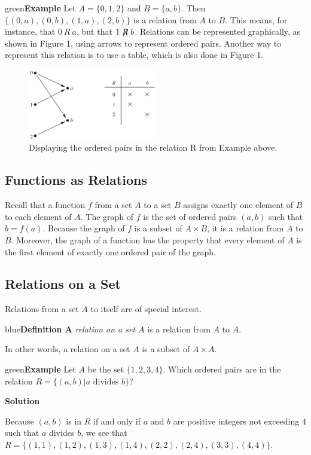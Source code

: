 \documentclass[11pt]{article}
\newenvironment{example}[1][\unskip]{\begin{mybox}{green}{\textbf{Example} {#1}}}{\end{mybox}}
\newenvironment{definition}[1]{\begin{mybox}{blue}{\textbf{Definition #1}}}{\end{mybox}}
\begin{document}
\begin{example}
Let $A = \{0, 1, 2\}$ and $B = \{a, b\}$. Then $\{(0, a), (0, b), (1, a), (2, b)\}$ is a relation from $A$ to $B$. This means, for instance, that $0\ R\ a$, but that $1 \centernot{R} b$. Relations can be represented graphically, as shown in Figure 1, using arrows to represent ordered pairs. Another way to represent this relation is to use a table, which is also done in Figure 1.
\end{example}

\begin{figure}[h!]
    \centering
    \includegraphics[width=0.5\textwidth]{./img/Displaying-ordered-pairs-Fig1.png}
    \caption{Displaying the ordered pairs in the relation R from Example above.}
    \label{fig:my_label}
\end{figure}

\subsection{Functions as Relations}
Recall that a function $f$ from a set $A$ to a set $B$ assigns exactly one element of $B$ to each element of $A$. The graph of $f$ is the set of ordered pairs $(a, b)$ such that $b = f(a)$. Because the graph of $f$ is a subset of $A \times B$, it is a relation from $A$ to $B$. Moreover, the graph of a function has the property that every element of $A$ is the first element of exactly one ordered pair of the graph.

\subsection{Relations on a Set}
Relations from a set $A$ to itself are of special interest.

\begin{definition}{2}
A \textit{relation on a set $A$} is a relation from $A$ to $A$.
\end{definition}

In other words, a relation on a set $A$ is a subset of $A \times A$.

\begin{example}
Let $A$ be the set $\{1, 2, 3, 4\}$. Which ordered pairs are in the relation $R = \{(a, b) | a \text{ divides } b\}$?

\textbf{Solution}

Because $(a, b)$ is in $R$ if and only if $a$ and $b$ are positive integers not exceeding 4 such that $a$ divides $b$, we see that $R = \{(1, 1), (1, 2), (1, 3), (1, 4), (2, 2), (2, 4), (3, 3), (4, 4)\}$.
\end{example}
\end{document}

